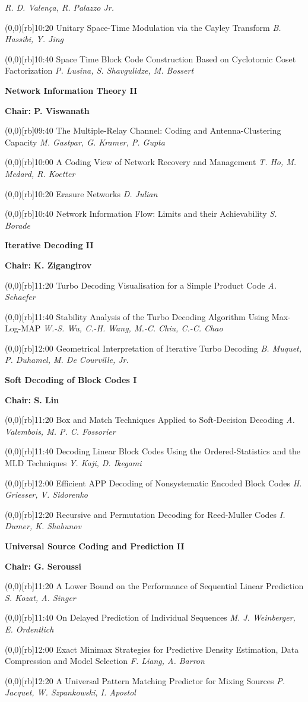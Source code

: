 \documentclass[a5paper,twoside]{article}
\def\period#1{\flushleft{\large\bfseries #1}\markboth{\sf #1}{\sf #1}}
\def\sesstitle#1{\vspace{.45\bigskipamount}\par{\bfseries #1}\par}
\def\sesschair#1{{\bfseries Chair: #1}\par\vspace{.65\medskipamount}}
\def\papertime#1{\makebox(0,0)[rb]{{\scriptsize #1}\hspace{.5em}}}
\def\papertitle#1{#1\hfil\break}
\def\paperauthors#1{{\itshape #1}\par\filbreak\vspace{.65\medskipamount}}
\begin{document}
\paperauthors{R. D. Valen\c{c}a, R. Palazzo Jr.}
\papertime{10:20}%
\papertitle{Unitary Space-Time Modulation via the Cayley Transform}
\paperauthors{B. Hassibi, Y. Jing}
\papertime{10:40}%
\papertitle{Space Time Block Code Construction Based on Cyclotomic Coset Factorization}
\paperauthors{P. Lusina, S. Shavgulidze, M. Bossert}
\sesstitle{Network Information Theory II}
\sesschair{P. Viswanath}
\papertime{09:40}%
\papertitle{The Multiple-Relay Channel: Coding and Antenna-Clustering Capacity}
\paperauthors{M. Gastpar, G. Kramer, P. Gupta}
\papertime{10:00}%
\papertitle{A Coding View of Network Recovery and Management}
\paperauthors{T. Ho, M. Medard, R. Koetter}
\papertime{10:20}%
\papertitle{Erasure Networks}
\paperauthors{D. Julian}
\papertime{10:40}%
\papertitle{Network Information Flow: Limits and their Achievability}
\paperauthors{S. Borade}
\period{Tue 11:20 -- 13:00}
\sesstitle{Iterative Decoding II}
\sesschair{K. Zigangirov}
\papertime{11:20}%
\papertitle{Turbo Decoding Visualisation for a Simple Product Code}
\paperauthors{A. Schaefer}
\papertime{11:40}%
\papertitle{Stability Analysis of the Turbo Decoding Algorithm Using Max-Log-MAP}
\paperauthors{W.-S. Wu, C.-H. Wang, M.-C. Chiu, C.-C. Chao}
\papertime{12:00}%
\papertitle{Geometrical Interpretation of Iterative Turbo Decoding}
\paperauthors{B. Muquet, P. Duhamel, M. De Courville, Jr.}
\sesstitle{Soft Decoding of Block Codes I}
\sesschair{S. Lin}
\papertime{11:20}%
\papertitle{Box and Match Techniques Applied to Soft-Decision Decoding}
\paperauthors{A. Valembois, M. P. C. Fossorier}
\papertime{11:40}%
\papertitle{Decoding Linear Block Codes Using the Ordered-Statistics and the MLD Techniques}
\paperauthors{Y. Kaji, D. Ikegami}
\papertime{12:00}%
\papertitle{Efficient APP Decoding of Nonsystematic Encoded Block Codes}
\paperauthors{H. Griesser, V. Sidorenko}
\papertime{12:20}%
\papertitle{Recursive and Permutation Decoding for Reed-Muller Codes}
\paperauthors{I. Dumer, K. Shabunov}
\sesstitle{Universal Source Coding and Prediction II}
\sesschair{G. Seroussi}
\papertime{11:20}%
\papertitle{A Lower Bound on the Performance of Sequential Linear Prediction}
\paperauthors{S. Kozat, A. Singer}
\papertime{11:40}%
\papertitle{On Delayed Prediction of Individual Sequences}
\paperauthors{M. J. Weinberger, E. Ordentlich}
\papertime{12:00}%
\papertitle{Exact Minimax Strategies for Predictive Density Estimation, Data Compression and Model Selection}
\paperauthors{F. Liang, A. Barron}
\papertime{12:20}%
\papertitle{A Universal Pattern Matching Predictor for Mixing Sources}
\paperauthors{P. Jacquet, W. Szpankowski, I. Apostol}
\end{document}
